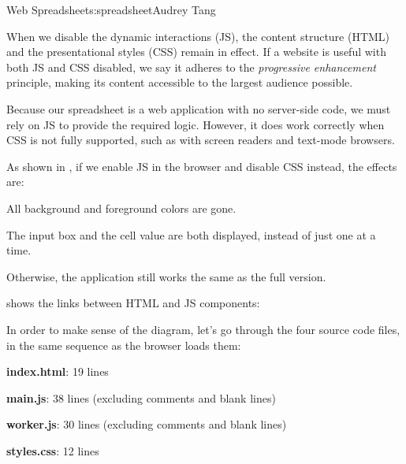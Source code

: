 \begin{aosachapter}{Web Spreadsheet}{s:spreadsheet}{Audrey Tang}

When we disable the dynamic interactions (JS), the content structure
(HTML) and the presentational styles (CSS) remain in effect. If a
website is useful with both JS and CSS disabled, we say it adheres to
the \emph{progressive enhancement} principle, making its content
accessible to the largest audience possible.

Because our spreadsheet is a web application with no server-side code,
we must rely on JS to provide the required logic. However, it does work
correctly when CSS is not fully supported, such as with screen readers
and text-mode browsers.


As shown in , if we enable JS in the
browser and disable CSS instead, the effects are:

\begin{aosaitemize}

\item
  All background and foreground colors are gone.
\item
  The input box and the cell value are both displayed, instead of just
  one at a time.
\item
  Otherwise, the application still works the same as the full version.
\end{aosaitemize}

\label{code-walkthrough}

 shows the links between HTML
and JS components:


In order to make sense of the diagram, let's go through the four source
code files, in the same sequence as the browser loads them:

\begin{aosaitemize}

\item
  \textbf{index.html}: 19 lines
\item
  \textbf{main.js}: 38 lines (excluding comments and blank lines)
\item
  \textbf{worker.js}: 30 lines (excluding comments and blank lines)
\item
  \textbf{styles.css}: 12 lines
\end{aosaitemize}


\end{aosachapter}
